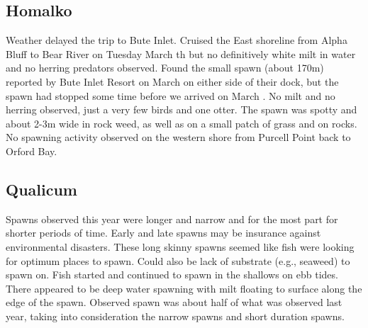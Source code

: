 \subsection{Homalko}

Weather delayed the trip to Bute Inlet.
Cruised the East shoreline from Alpha Bluff to Bear River
on Tuesday March th but no definitively white milt in water and
no herring predators observed.
Found the small spawn (about 170m) reported by Bute Inlet Resort
on March  on either side of their dock, but
the spawn had stopped some time before we arrived on March .
No milt and no herring observed, just a very few birds and one otter.
The spawn was spotty and about 2-3m wide in rock weed, as well as
on a small patch of grass and on rocks.
No spawning activity observed on the western shore
from Purcell Point back to Orford Bay.


\subsection{Qualicum}

Spawns observed this year were longer and narrow and for the most part
for shorter periods of time.
Early and late spawns may be insurance against environmental disasters.
These long skinny spawns seemed like fish
were looking for optimum places to spawn.
Could also be lack of substrate (e.g., seaweed) to spawn on.
Fish started and continued to spawn in the shallows on ebb tides.
There appeared to be deep water spawning
with milt floating to surface along the edge of the spawn.
Observed spawn was about half of what was observed last year,
taking into consideration the narrow spawns and short duration spawns.

